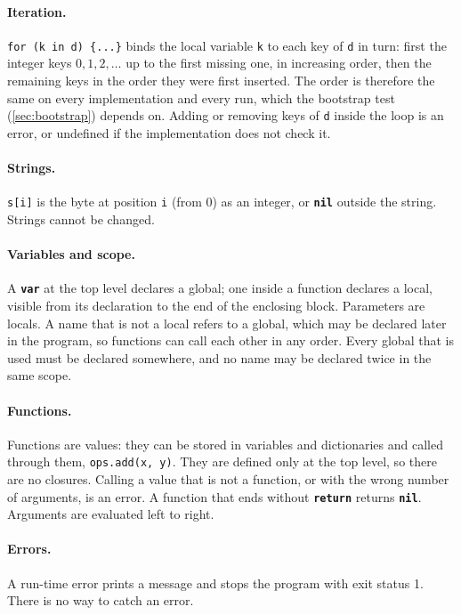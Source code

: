 \documentclass[11pt,a4paper]{article}
\newcommand{\kw}[1]{\textbf{\texttt{#1}}}
\begin{document}
\paragraph{Iteration.} \verb|for (k in d) {...}| binds the local variable
\verb|k| to each key of \verb|d| in turn: first the integer keys $0, 1, 2,
\ldots$ up to the first missing one, in increasing order, then the remaining
keys in the order they were first inserted. The order is therefore the same
on every implementation and every run, which the bootstrap test
(\cref{sec:bootstrap}) depends on. Adding or removing keys of \verb|d|
inside the loop is an error, or undefined if the implementation does not
check it.

\paragraph{Strings.} \verb|s[i]| is the byte at position \verb|i| (from 0)
as an integer, or \kw{nil} outside the string. Strings cannot be changed.

\paragraph{Variables and scope.} A \kw{var} at the top level declares a
global; one inside a function declares a local, visible from its declaration
to the end of the enclosing block. Parameters are locals. A name that is not
a local refers to a global, which may be declared later in the program, so
functions can call each other in any order. Every global that is used must
be declared somewhere, and no name may be declared twice in the same scope.

\paragraph{Functions.} Functions are values: they can be stored in variables
and dictionaries and called through them, \verb|ops.add(x, y)|. They are
defined only at the top level, so there are no closures. Calling a value
that is not a function, or with the wrong number of arguments, is an error.
A function that ends without \kw{return} returns \kw{nil}. Arguments are
evaluated left to right.

\paragraph{Errors.} A run-time error prints a message and stops the program
with exit status 1. There is no way to catch an error.
\end{document}

